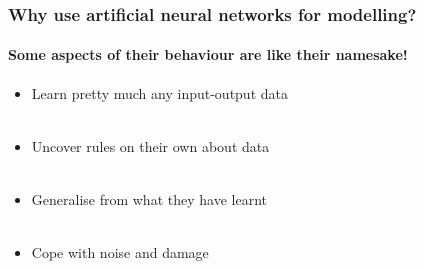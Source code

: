 \documentclass{beamer}
\begin{document}
\begin{frame}
\frametitle{Why use artificial neural networks for modelling?}
\framesubtitle{Some aspects of their behaviour are like their namesake!}
\begin{itemize}
\item Learn pretty much any input-output data \\ \
 \item Uncover rules on their own about data  \\ \
\item Generalise from what they have learnt \\ \
\item Cope with noise and damage \\ \
\end{itemize}
\end{frame}
\end{document}
